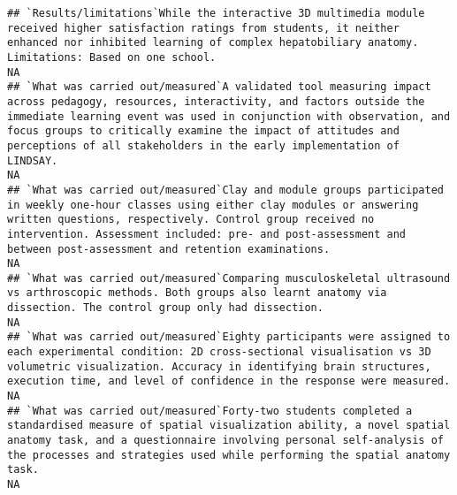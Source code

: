 \documentclass[]{article}
\begin{document}
\begin{verbatim}
## `Results/limitations`While the interactive 3D multimedia module received higher satisfaction ratings from students, it neither enhanced nor inhibited learning of complex hepatobiliary anatomy. Limitations: Based on one school.                                                                                                                                                                                                                                                   NA
## `What was carried out/measured`A validated tool measuring impact across pedagogy, resources, interactivity, and factors outside the immediate learning event was used in conjunction with observation, and focus groups to critically examine the impact of attitudes and perceptions of all stakeholders in the early implementation of LINDSAY.                                                                                                                                    NA
## `What was carried out/measured`Clay and module groups participated in weekly one-hour classes using either clay modules or answering written questions, respectively. Control group received no intervention. Assessment included: pre- and post-assessment and between post-assessment and retention examinations.                                                                                                                                                                  NA
## `What was carried out/measured`Comparing musculoskeletal ultrasound vs arthroscopic methods. Both groups also learnt anatomy via dissection. The control group only had dissection.                                                                                                                                                                                                                                                                                                  NA
## `What was carried out/measured`Eighty participants were assigned to each experimental condition: 2D cross-sectional visualisation vs 3D volumetric visualization. Accuracy in identifying brain structures, execution time, and level of confidence in the response were measured.                                                                                                                                                                                                   NA
## `What was carried out/measured`Forty-two students completed a standardised measure of spatial visualization ability, a novel spatial anatomy task, and a questionnaire involving personal self-analysis of the processes and strategies used while performing the spatial anatomy task.                                                                                                                                                                                              NA

\end{verbatim}
\end{document}
